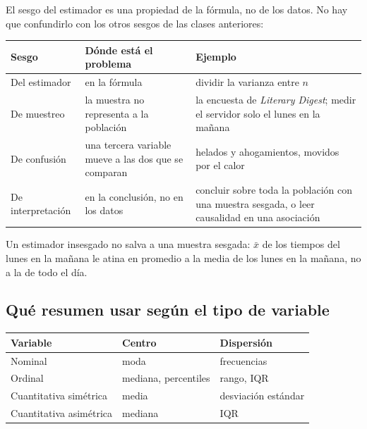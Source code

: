 \documentclass[11pt,letterpaper]{article}
\begin{document}
El sesgo del estimador es una propiedad de la fórmula, no de los datos.
No hay que confundirlo con los otros sesgos de las clases anteriores:

\begin{center}
\small
\begin{tabular}{l>{\raggedright\arraybackslash}p{4.6cm}%
                 >{\raggedright\arraybackslash}p{6.2cm}}
    \toprule
    \textbf{Sesgo} & \textbf{Dónde está el problema} & \textbf{Ejemplo} \\
    \midrule
    Del estimador & en la fórmula & dividir la varianza entre $n$ \\
    \addlinespace
    De muestreo & la muestra no representa a la población
                & la encuesta de \textit{Literary Digest}; medir el
                  servidor solo el lunes en la mañana \\
    \addlinespace
    De confusión & una tercera variable mueve a las dos que se comparan
                 & helados y ahogamientos, movidos por el calor \\
    \addlinespace
    De interpretación & en la conclusión, no en los datos
                      & concluir sobre toda la población con una muestra
                        sesgada, o leer causalidad en una asociación \\
    \bottomrule
\end{tabular}
\end{center}

Un estimador insesgado no salva a una muestra sesgada: $\bar{x}$ de
los tiempos del lunes en la mañana le atina en promedio a la media de
los lunes en la mañana, no a la de todo el día.


\subsection*{Qué resumen usar según el tipo de variable}

\begin{center}
\begin{tabular}{lll}
    \toprule
    \textbf{Variable} & \textbf{Centro} & \textbf{Dispersión} \\
    \midrule
    Nominal & moda & frecuencias \\
    Ordinal & mediana, percentiles & rango, IQR \\
    Cuantitativa simétrica & media & desviación estándar \\
    Cuantitativa asimétrica & mediana & IQR \\
    \bottomrule
\end{tabular}
\end{center}
\end{document}
